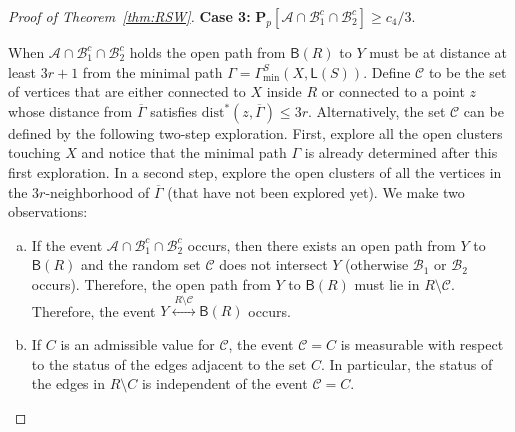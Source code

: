 \documentclass[12pt, twoside,a4paper,reqno]{amsart}
\theoremstyle{plain}
\theoremstyle{remark}
\theoremstyle{definition}
\newcommand{\PP}{\mathbf{P}}
\newcommand{\Pp}[1]{\PP_p \left [ #1 \right ]}
\newcommand{\lr}[1][]{\overset{\:#1\:}\longleftrightarrow}
\newcommand{\cal}{\mathcal}
\renewcommand{\bar}{\overline}
\begin{document}
\begin{proof}[Proof of Theorem~\ref{thm:RSW}]
\textbf{Case 3:} $\Pp{\cal A\cap \cal B_1^c \cap\cal B_2^c}\ge c_4/3$.


   When $\cal A\cap \cal B_1^c \cap\cal B_2^c$ holds the open path from
  $\mathsf B(R)$ to $Y$ must be at distance at least $3r+1$ from the minimal
  path $\Gamma=\Gamma_{\min}^S(X,\mathsf L(S))$. Define $\mathscr C$ to be the set
  of vertices that are either connected to $X$ inside $R$ or connected to a
  point $z$ whose distance from $\bar \Gamma$ satisfies $\mathrm{dist^{*}}(z,\bar
  \Gamma)\le 3r$. Alternatively, the set $\mathscr C$ can be defined by the
  following two-step exploration. First, explore all the open clusters touching $X$
  and notice that the minimal path $\Gamma$ is already determined after this first
  exploration. In a second step, explore the open clusters of all the vertices in the
  $3r$-neighborhood of $\bar\Gamma$ (that have not been explored yet). We make two
  observations:
  \begin{enumerate}[(a)]
  \item If the event $\cal A\cap \cal B_1^c \cap\cal B_2^c$ occurs, then there
    exists an open path from $Y$ to $\mathsf B(R)$ and the random set $\mathscr
    C$ does not intersect $Y$ (otherwise $\mathcal B_1$ or $\mathcal B_2$
    occurs). Therefore, the open path from $Y$ to $\mathsf B(R)$ must lie in
    $R\setminus\mathscr C$. Therefore, the event $Y \lr[R\setminus \mathscr C]
      \mathsf B(R)$ occurs.
  \item If $C$ is an admissible value for $\mathscr C$, the event $\mathscr C=C$
    is measurable with respect to the status of the edges adjacent to the set
    $C$. In particular, the status of the edges in $R\setminus  C$ is independent of
the event $\mathscr C=C$.
  \end{enumerate}


\end{proof}
\end{document}
